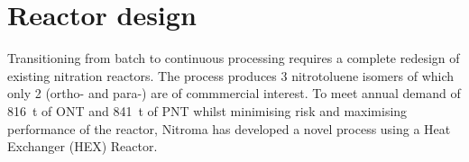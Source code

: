 \section*{Reactor design}
Transitioning from batch to continuous processing requires a complete redesign of existing nitration reactors. The process produces 3 nitrotoluene isomers of which only 2 (ortho- and para-) are of commmercial interest. To meet annual demand of \SI{816}{\tonne} of ONT and \SI{841}{\tonne} of PNT whilst minimising risk and maximising performance of the reactor, Nitroma has developed a novel process using a Heat Exchanger (HEX) Reactor.


